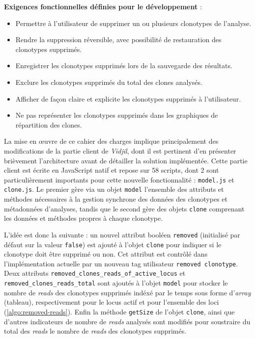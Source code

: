 \vspace{1em}

\textbf{Exigences fonctionnelles définies pour le développement} :
\begin{itemize}
    \item Permettre à l'utilisateur de supprimer un ou plusieurs clonotypes de l'analyse.
    \item Rendre la suppression réversible, avec possibilité de restauration des clonotypes supprimés.
    \item Enregistrer les clonotypes supprimés lors de la sauvegarde des résultats.
    \item Exclure les clonotypes supprimés du total des clones analysés.
    \item Afficher de façon claire et explicite les clonotypes supprimés à l'utilisateur.
    \item Ne pas représenter les clonotypes supprimés dans les graphiques de répartition des clones.
\end{itemize}

\vspace{1em}

La mise en œuvre de ce cahier des charges implique principalement des modifications de la partie client de \textit{Vidjil}, dont il est 
pertinent d'en présenter brièvement l'architecture avant de détailler la solution implémentée. Cette partie client est écrite en JavaScript natif 
et repose sur 58 scripts, dont 2 sont particulièrement importants pour cette nouvelle fonctionnalité : \texttt{model.js} et \texttt{clone.js}. 
Le premier gère via un objet \texttt{model} l'ensemble des attributs et méthodes nécessaires à la gestion synchrone des données des clonotypes 
et métadonnées d'analyses, tandis que le second gère des objets \texttt{clone} comprenant les données et méthodes propres à chaque clonotype. 

\vspace{1em}

L'idée est donc la suivante : un nouvel attribut booléen \texttt{removed} (initialisé par défaut sur la valeur \texttt{false}) est ajouté à l'objet 
\texttt{clone} pour indiquer si le clonotype doit être supprimé ou non. Cet attribut est contrôlé dans l'implémentation actuelle par un nouveau 
tag utilisateur \texttt{removed\ clonotype}. Deux attributs \texttt{removed\_clones\_reads\_of\_active\_locus} et \texttt{removed\_clones\_reads\_total} sont 
ajoutés à l'objet \texttt{model} pour stocker le nombre de \textit{reads} des clonotypes supprimés indéxé par le temps sous forme d'\textit{array} (tableau), 
respectivement pour le locus actif et pour l'ensemble des loci (\autoref{algo:removed-reads}). 
Enfin la méthode \texttt{getSize} de l'objet \texttt{clone}, ainsi que d'autres indicateurs de nombre de \textit{reads} analysés sont modifiés pour soustraire du 
total des \textit{reads} le nombre de \textit{reads} des clonotypes supprimés.

